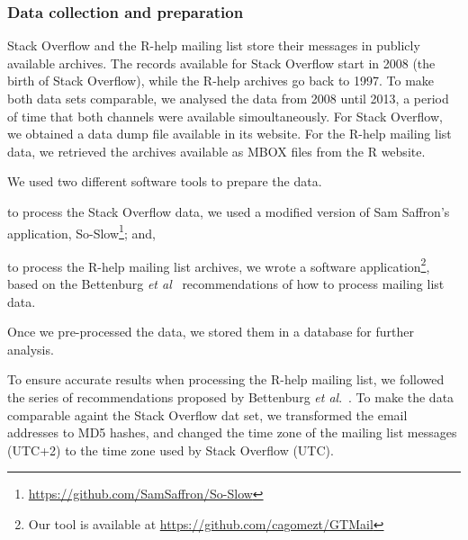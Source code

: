 \subsubsection{Data collection and preparation}
\label{subsec:preparation}

	Stack Overflow and the R-help mailing list store their messages in publicly available archives.
	The records available for Stack Overflow start in 2008 (the birth of Stack Overflow), while the R-help archives go back to 1997.
	To make both data sets comparable, we analysed the data from 2008 until 2013, a period of time that both channels were available simoultaneously.
For Stack Overflow, we obtained a data dump file available in its website.
For the R-help mailing list data, we retrieved the archives available as MBOX files from the R website.

	We used two different software tools to prepare the data.
	\begin{enumerate*}[label=(\arabic*)]
	\item to process the Stack Overflow data, we used a modified version of Sam Saffron's application, So-Slow\footnote{\url{https://github.com/SamSaffron/So-Slow}}; and,
	\item to process the R-help mailing list archives, we wrote a software application\footnote{Our tool is available at \url{https://github.com/cagomezt/GTMail}}, based on the Bettenburg \textit{et al}~\cite{Bettenburg2009} recommendations of how to process mailing list data.
	\end{enumerate*}
    Once we pre-processed the data, we stored them in a database for further analysis.



To ensure accurate results when processing the R-help mailing list, we followed the series of recommendations proposed by Bettenburg \textit{et al}.~\cite{Bettenburg2009}.
To make the data comparable againt the Stack Overflow dat set, we transformed the email addresses to MD5 hashes, and changed the time zone of the mailing list messages (UTC+2) to the time zone used by Stack Overflow (UTC).

